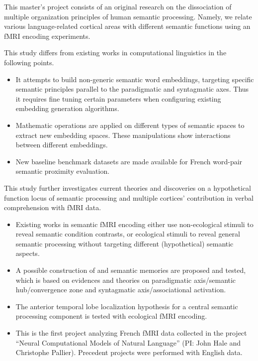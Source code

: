 \begin{declarationauthorship}
    \noindent This master's project consists of an original research on the dissociation of multiple organization principles of human semantic processing. Namely, we relate various language-related cortical areas with different semantic functions using an fMRI encoding experiments. 
    
    This study differs from existing works in computational linguistics in the following points.
    \begin{itemize}
    \item It attempts to build non-generic semantic word embeddings, targeting specific semantic principles parallel to the paradigmatic and syntagmatic axes. Thus it requires fine tuning certain parameters when configuring existing embedding generation algorithms.
    \item Mathematic operations are applied on different types of semantic spaces to extract new embedding spaces. These manipulations show interactions between different embeddings.
    \item New baseline benchmark datasets are made available for French word-pair semantic proximity evaluation.
    \end{itemize}
    
    This study further investigates current theories and discoveries on a hypothetical function locus of semantic processing and multiple cortices' contribution in verbal comprehension with fMRI data.
    \begin{itemize}
    \item Existing works in semantic fMRI encoding either use non-ecological stimuli to reveal semantic condition contrasts, or ecological stimuli to reveal general semantic processing without targeting different (hypothetical) semantic aspects.
    \item A possible construction of \similarity and \association semantic memories are proposed and tested, which is based on evidences and theories on paradigmatic axis/semantic hub/convergence zone and syntagmatic axis\slash associational activation.
    \item The anterior temporal lobe localization hypothesis for a central semantic processing component is tested with ecological fMRI encoding.
    \item This is the first project analyzing French fMRI data collected in the project ``Neural Computational Models of Natural Language'' (PI: John Hale and Christophe Pallier). Precedent projects were performed with English data.
    \end{itemize}
    

\end{declarationauthorship}
